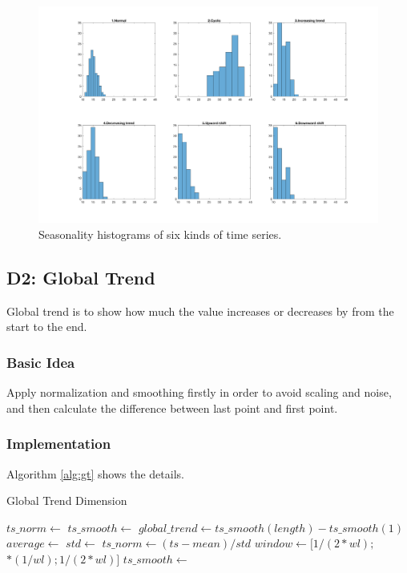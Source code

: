 \documentclass[a4paper]{article}
\begin{document}
\begin{figure}[htbp]
\centering
\includegraphics[width=1\textwidth]{seasonality.png}
\caption{\label{fig:seasonality}Seasonality histograms of six kinds of time series.}
\end{figure}

\subsection{D2: Global Trend}
Global trend is to show how much the value increases or decreases by from the start to the end. 

\subsubsection{Basic Idea}
Apply normalization and smoothing firstly in order to avoid scaling and noise, and then calculate the difference between last point and first point.

\subsubsection{Implementation}
Algorithm \ref{alg:gt} shows the details.

\begin{algorithm}
\caption{Global Trend Dimension} \label{alg:gt}
\begin{algorithmic}[1] 
	\State $ts\_norm \gets$ 
	\State $ts\_smooth \gets$ 
	\State $global\_trend \gets ts\_smooth(length) - ts\_smooth(1)$
	\State
		\State $average \gets$ 
		\State $std \gets$ 
		\State $ts\_norm \gets (ts - mean) / std$
		\State {}
	\EndFunction
	\State
		\State $window \gets [1/(2*wl);$ $*(1/wl); 1/(2*wl)]$
		\State $ts\_smooth \gets$ 
		\State {}
	\EndFunction
\end{algorithmic}
\end{algorithm}
\end{document}
